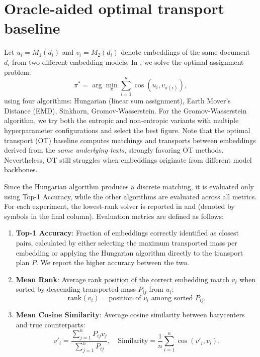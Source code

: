 \section{Oracle-aided optimal transport baseline}
\label{sec:ot_baseline}
Let $u_i = M_1(d_i)$ and $v_i = M_2(d_i)$ denote embeddings of the same document $d_i$ from two different embedding models. In , we solve the optimal assignment problem:
\[
\pi^* = \arg\min_{\pi} \sum_{i=1}^n \cos(u_i, v_{\pi(i)}),
\]
using four algorithms: Hungarian (linear sum assignment), Earth Mover's Distance (EMD), Sinkhorn, Gromov-Wasserstein. For the Gromov-Wasserstein algorithm, we try both the entropic and non-entropic variants with multiple hyperparameter configurations and select the best figure. Note that the optimal transport (OT) baseline computes matchings and transports between embeddings derived from the \textit{same underlying texts}, strongly favoring OT methods. Nevertheless, OT still struggles when embeddings originate from different model backbones.

Since the Hungarian algorithm produces a discrete matching, it is evaluated only using Top-1 Accuracy, while the other algorithms are evaluated across all metrics. For each experiment, the lowest-rank solver is reported in  and  (denoted by symbols in the final column). Evaluation metrics are defined as follows:

\begin{enumerate}
    \item \textbf{Top-1 Accuracy}: Fraction of embeddings correctly identified as closest pairs, calculated by either selecting the maximum transported mass per embedding or applying the Hungarian algorithm directly to the transport plan $P$. We report the higher accuracy between the two.
    \item \textbf{Mean Rank}: Average rank position of the correct embedding match $v_i$ when sorted by descending transported mass $P_{ij}$ from $u_i$:
    \[
    \text{rank}(v_i) = \text{position of } v_i \text{ among sorted } P_{ij}.
    \]
    \item \textbf{Mean Cosine Similarity}: Average cosine similarity between barycenters and true counterparts:
    \[
    v'_i = \frac{\sum_{j=1}^n P_{ij} v_j}{\sum_{j=1}^n P_{ij}},\quad
    \text{Similarity} = \frac{1}{n}\sum_{i=1}^{n}\cos(v'_i,v_i).
    \]
\end{enumerate}
\newpage
